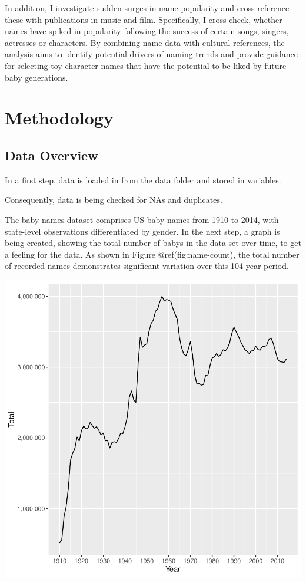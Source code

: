 \documentclass[11pt,preprint]{elsarticle}
\let\origfigure\figure
\let\endorigfigure\endfigure
\renewenvironment{figure}[1][2] {
    \expandafter\origfigure\expandafter[H]
} {
    \endorigfigure
}
\numberwithin{equation}{section}
\numberwithin{figure}{section}
\numberwithin{table}{section}
\begin{document}
In addition, I investigate sudden surges in name popularity and
cross-reference these with publications in music and film. Specifically,
I cross-check, whether names have spiked in popularity following the
success of certain songs, singers, actresses or characters. By combining
name data with cultural references, the analysis aims to identify
potential drivers of naming trends and provide guidance for selecting
toy character names that have the potential to be liked by future baby
generations.

\section{Methodology}\label{methodology}

\subsection{Data Overview}\label{data-overview}

In a first step, data is loaded in from the data folder and stored in
variables.

Consequently, data is being checked for NAs and duplicates.

The baby names dataset comprises US baby names from 1910 to 2014, with
state-level observations differentiated by gender. In the next step, a
graph is being created, showing the total number of babys in the data
set over time, to get a feeling for the data. As shown in Figure
@ref(fig:name-count), the total number of recorded names demonstrates
significant variation over this 104-year period.

\begin{figure}[H]

{\centering \includegraphics{Task_1_ReadMe_files/figure-latex/name-count-1} 

}

\caption{Annual Count of Unique Baby Names in the U.S., 1910-2014}\label{fig:name-count}
\end{figure}
\end{document}
